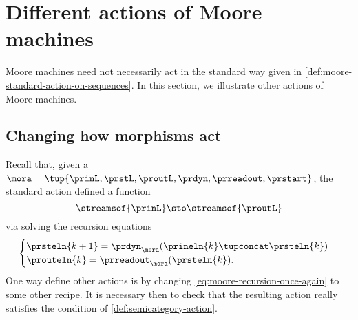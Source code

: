 
\section{Different actions of Moore machines}
\label{sec:different-actions-of-moore-machines}

Moore machines need not necessarily act in the standard way given in \cref{def:moore-standard-action-on-sequences}.
In this section, we illustrate other actions of Moore machines.

\subsection{Changing how morphisms act}

Recall that, given a ~$\mora = \tup{\prinL,\prstL,\proutL,\prdyn,\prreadout,\prstart}$, the standard action defined a function
\begin{equation}
    \streamsof{\prinL}  \sto \streamsof{\proutL}
\end{equation}
via solving the recursion equations
\begin{equation}
    \label{eq:moore-recursion-once-again}
    \begin{cases}
        \prsteln{k+1} = \prdyn_\mora(\prineln{k} \tupconcat \prsteln{k}) \\
        \prouteln{k}   = \prreadout_\mora(\prsteln{k}).
    \end{cases}
\end{equation}
%
One way define other actions is by changing \cref{eq:moore-recursion-once-again} to some other recipe.
It is necessary then to check that the resulting action really satisfies the condition of \cref{def:semicategory-action}.

